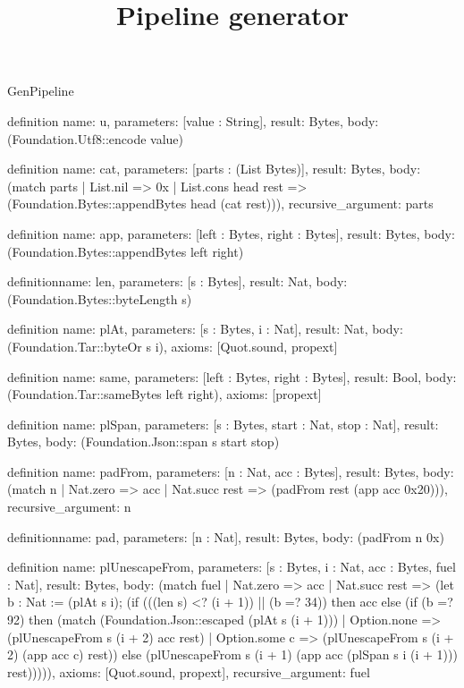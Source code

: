 \begin{lexlean}{GenPipeline}
\title{Pipeline generator}
\begin{semanticmodule}
definition{
  name: u,
  parameters: [value : String],
  result: Bytes,
  body: (Foundation.Utf8::encode value)
}

definition{
  name: cat,
  parameters: [parts : (List Bytes)],
  result: Bytes,
  body: (match parts
    | List.nil => 0x
    | List.cons head rest => (Foundation.Bytes::appendBytes head (cat rest))),
  recursive_argument: parts
}

definition{
  name: app,
  parameters: [left : Bytes, right : Bytes],
  result: Bytes,
  body: (Foundation.Bytes::appendBytes left right)
}

definition{name: len, parameters: [s : Bytes], result: Nat, body: (Foundation.Bytes::byteLength s)}

definition{
  name: plAt,
  parameters: [s : Bytes, i : Nat],
  result: Nat,
  body: (Foundation.Tar::byteOr s i),
  axioms: [Quot.sound, propext]
}

definition{
  name: same,
  parameters: [left : Bytes, right : Bytes],
  result: Bool,
  body: (Foundation.Tar::sameBytes left right),
  axioms: [propext]
}

definition{
  name: plSpan,
  parameters: [s : Bytes, start : Nat, stop : Nat],
  result: Bytes,
  body: (Foundation.Json::span s start stop)
}

definition{
  name: padFrom,
  parameters: [n : Nat, acc : Bytes],
  result: Bytes,
  body: (match n | Nat.zero => acc | Nat.succ rest => (padFrom rest (app acc 0x20))),
  recursive_argument: n
}

definition{name: pad, parameters: [n : Nat], result: Bytes, body: (padFrom n 0x)}

definition{
  name: plUnescapeFrom,
  parameters: [s : Bytes, i : Nat, acc : Bytes, fuel : Nat],
  result: Bytes,
  body: (match fuel
    | Nat.zero => acc
    | Nat.succ rest => (let b : Nat := (plAt s i); (if (((len s) <? (i + 1)) || (b =? 34)) then acc else (if (b =? 92) then (match (Foundation.Json::escaped (plAt s (i + 1)))
      | Option.none => (plUnescapeFrom s (i + 2) acc rest)
      | Option.some c => (plUnescapeFrom s (i + 2) (app acc c) rest)) else (plUnescapeFrom s (i + 1) (app acc (plSpan s i (i + 1))) rest))))),
  axioms: [Quot.sound, propext],
  recursive_argument: fuel
}


\end{semanticmodule}
\end{lexlean}
